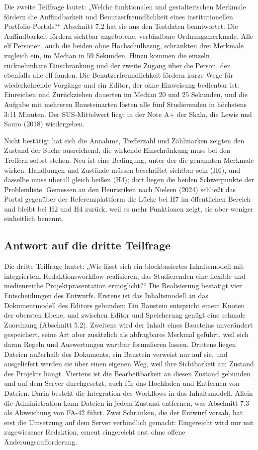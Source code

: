 Die zweite Teilfrage lautet: „Welche funktionalen und gestalterischen Merkmale fördern die Auffindbarkeit und Benutzerfreundlichkeit eines institutionellen Portfolio-Portals?“ Abschnitt 7.2 hat sie aus den Testdaten beantwortet. Die Auffindbarkeit fördern sichtbar angebotene, verbindbare Ordnungsmerkmale. Alle elf Personen, auch die beiden ohne Hochschulbezug, schränkten drei Merkmale zugleich ein, im Median in 59 Sekunden. Hinzu kommen die einzeln rücknehmbare Einschränkung und der zweite Zugang über die Person, den ebenfalls alle elf fanden. Die Benutzerfreundlichkeit fördern kurze Wege für wiederkehrende Vorgänge und ein Editor, der ohne Einweisung bedienbar ist: Einreichen und Zurückziehen dauerten im Median 20 und 25 Sekunden, und die Aufgabe mit mehreren Bausteinarten lösten alle fünf Studierenden in höchstens 3:11 Minuten. Der SUS-Mittelwert liegt in der Note A+ der Skala, die Lewis und Sauro (2018) wiedergeben.

Nicht bestätigt hat sich die Annahme, Trefferzahl und Zählmarken zeigten den Zustand der Suche ausreichend; die wirkende Einschränkung muss bei den Treffern selbst stehen. Neu ist eine Bedingung, unter der die genannten Merkmale wirken: Handlungen und Zustände müssen beschriftet sichtbar sein (H6), und dasselbe muss überall gleich heißen (H4); dort liegen die beiden Schwerpunkte der Problemliste. Gemessen an den Heuristiken nach Nielsen (2024) schließt das Portal gegenüber der Referenzplattform die Lücke bei H7 im öffentlichen Bereich und bleibt bei H2 und H4 zurück, weil es mehr Funktionen zeigt, sie aber weniger einheitlich benennt.

\subsection{Antwort auf die dritte Teilfrage}

Die dritte Teilfrage lautet: „Wie lässt sich ein blockbasiertes Inhaltsmodell mit integriertem Redaktionsworkflow realisieren, das Studierenden eine flexible und medienreiche Projektpräsentation ermöglicht?“ Die Realisierung bestätigt vier Entscheidungen des Entwurfs. Erstens ist das Inhaltsmodell an das Dokumentmodell des Editors gebunden: Ein Baustein entspricht einem Knoten der obersten Ebene, und zwischen Editor und Speicherung genügt eine schmale Zuordnung (Abschnitt 5.2). Zweitens wird der Inhalt eines Bausteins unverändert gespeichert, seine Art aber zusätzlich als abfragbares Merkmal geführt, weil sich daran Regeln und Auswertungen wartbar formulieren lassen. Drittens liegen Dateien außerhalb des Dokuments, ein Baustein verweist nur auf sie, und ausgeliefert werden sie über einen eigenen Weg, weil ihre Sichtbarkeit am Zustand des Projekts hängt. Viertens ist die Bearbeitbarkeit an diesen Zustand gebunden und auf dem Server durchgesetzt, auch für das Hochladen und Entfernen von Dateien. Darin besteht die Integration des Workflows in das Inhaltsmodell. Allein die Administration kann Dateien in jedem Zustand entfernen, was Abschnitt 7.3 als Abweichung von FA-42 führt. Zwei Schranken, die der Entwurf vorsah, hat erst die Umsetzung auf dem Server verbindlich gemacht: Eingereicht wird nur mit zugewiesener Redaktion, erneut eingereicht erst ohne offene Änderungsaufforderung.

